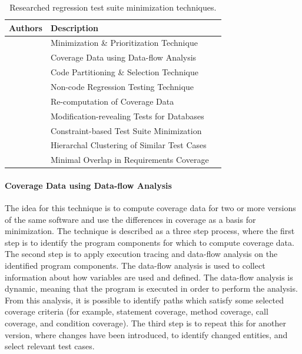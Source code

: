 \documentclass[a4paper,english,12pt]{report}
\begin{document}
\begin{table}[htbp]
  \centering
  \begin{tabular}{|l|l|l|}
    \hline
    \textbf{Authors} & \textbf{Description}\\
    \hline
    \citeauthor{wong1997study} & Minimization \& Prioritization Technique\\
    \hline
    \citeauthor{sivaprasad2011efficient} & Coverage Data using Data-flow Analysis\\
    \hline
    \citeauthor{orso2004scaling} & Code Partitioning \& Selection Technique\\
    \hline
    \citeauthor{nanda2011regression} & Non-code Regression Testing Technique\\
    \hline
    \citeauthor{chittimalli2009recomputing} & Re-computation of Coverage Data\\
    \hline
    \citeauthor{willmor2005safe} & Modification-revealing Tests for Databases\\
    \hline
    \citeauthor{sun2011constraint} & Constraint-based Test Suite Minimization\\
    \hline
    \citeauthor{prasad2012optimizer} & Hierarchal Clustering of Similar Test Cases\\
    \hline
    \citeauthor{parsa2010optimization} & Minimal Overlap in Requirements Coverage\\
    \hline
  \end{tabular}
  \caption{Researched regression test suite minimization techniques.}
  \label{tab:minimization-techniques}
\end{table}

\paragraph{Coverage Data using Data-flow Analysis \citep{sivaprasad2011efficient}}
The idea for this technique is to compute coverage data for two or more versions of the same software and use the differences in coverage as a basis for minimization. The technique is described as a three step process, where the first step is to identify the program components for which to compute coverage data. The second step is to apply execution tracing and data-flow analysis on the identified program components. The data-flow analysis is used to collect information about how variables are used and defined. The data-flow analysis is dynamic, meaning that the program is executed in order to perform the analysis. From this analysis, it is possible to identify paths which satisfy some selected coverage criteria (for example, statement coverage, method coverage, call coverage, and condition coverage). The third step is to repeat this for another version, where changes have been introduced, to identify changed entities, and select relevant test cases. \citep{sivaprasad2011efficient} 
\end{document}
